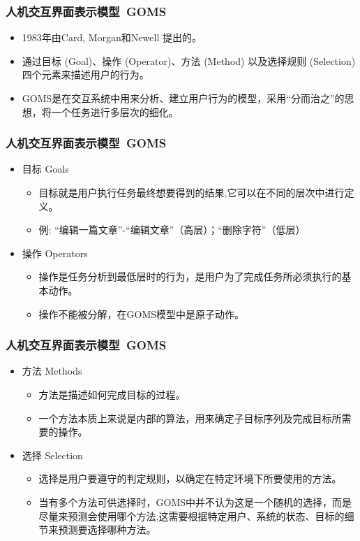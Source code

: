 \documentclass{beamer}
\begin{document}
\begin{frame}
	\frametitle{人机交互界面表示模型~{\small GOMS}}
	\begin{itemize}
		\item 1983年由Card, Morgan和Newell 提出的。
		\item 通过目标 (Goal)、操作 (Operator)、方法 (Method) 以及选择规则 (Selection) 四个元素来描述用户的行为。
		\item GOMS是在交互系统中用来分析、建立用户行为的模型，采用“分而治之”的思想，将一个任务进行多层次的细化。
	\end{itemize}
\end{frame}

\begin{frame}
	\frametitle{人机交互界面表示模型~{\small GOMS}}
	\beamertemplatetransparentcovereddynamicmedium
	\begin{itemize}
		\item 目标 Goals
		\begin{itemize}
			\item 目标就是用户执行任务最终想要得到的结果,它可以在不同的层次中进行定义。
			\item 例: “编辑一篇文章”-“编辑文章”（高层）；“删除字符”（低层）
		\end{itemize}
		\pause
		\item 操作 Operators
		\begin{itemize}
			\item 操作是任务分析到最低层时的行为，是用户为了完成任务所必须执行的基本动作。
			\item 操作不能被分解，在GOMS模型中是原子动作。
		\end{itemize}
	\end{itemize}
\end{frame}

\begin{frame}
	\frametitle{人机交互界面表示模型~{\small GOMS}}
	\beamertemplatetransparentcovereddynamicmedium
	\begin{itemize}
		\item 方法 Methods
		\begin{itemize}
			\item 方法是描述如何完成目标的过程。
			\item 一个方法本质上来说是内部的算法，用来确定子目标序列及完成目标所需要的操作。
		\end{itemize}
		\item 选择 Selection
		\begin{itemize}
			\item 选择是用户要遵守的判定规则，以确定在特定环境下所要使用的方法。
			\item 当有多个方法可供选择时，GOMS中并不认为这是一个随机的选择，而是尽量来预测会使用哪个方法,这需要根据特定用户、系统的状态、目标的细节来预测要选择哪种方法。
		\end{itemize}
	\end{itemize}
\end{frame}
\end{document}
